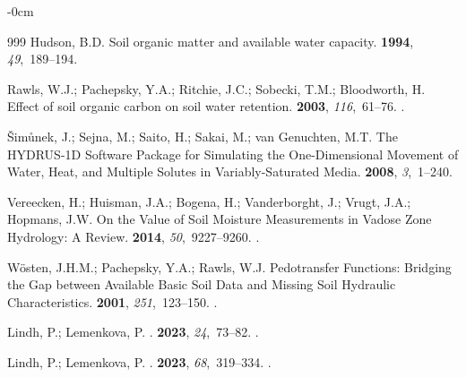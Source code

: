 \documentclass[land,review,accept,pdftex,oneauthor]{Definitions/mdpi}
\begin{document}
\begin{adjustwidth}{-\extralength}{0cm}
\begin{thebibliography}{999}
Hudson, B.D.
\newblock Soil organic matter and available water capacity.
 {\bf 1994}, {\em
  49},~189--194.

Rawls, W.J.; Pachepsky, Y.A.; Ritchie, J.C.; Sobecki, T.M.; Bloodworth, H.
\newblock Effect of soil organic carbon on soil water retention.
 {\bf 2003}, {\em 116},~61--76.
.

\v{S}im\r{u}nek, J.; Sejna, M.; Saito, H.; Sakai, M.; van Genuchten, M.T.
\newblock The {HYDRUS-1D} Software Package for Simulating the One-Dimensional
  Movement of Water, Heat, and Multiple Solutes in Variably-Saturated Media.
 {\bf 2008},
  {\em 3},~1--240.

Vereecken, H.; Huisman, J.A.; Bogena, H.; Vanderborght, J.; Vrugt, J.A.;
  Hopmans, J.W.
\newblock On the Value of Soil Moisture Measurements in Vadose Zone Hydrology:
  A Review.
 {\bf 2014}, {\em 50},~9227--9260.
.

W{\"o}sten, J.H.M.; Pachepsky, Y.A.; Rawls, W.J.
\newblock Pedotransfer Functions: Bridging the Gap between Available Basic Soil
  Data and Missing Soil Hydraulic Characteristics.
 {\bf 2001}, {\em 251},~123--150.
.

Lindh, P.; Lemenkova, P.
.
 {\bf 2023}, {\em
  24},~73--82.
.

Lindh, P.; Lemenkova, P.
.
 {\bf 2023}, {\em 68},~319--334.
.


\end{thebibliography}
\end{adjustwidth}
\end{document}
